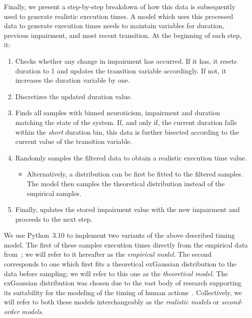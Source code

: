 Finally, we present a step-by-step breakdown of how this data is subsequently used to generate realistic execution times.
A model which uses this processed data to generate execution times needs to maintain variables for duration, previous impairment, and most recent transition.
At the beginning of each step, it:
\begin{enumerate}
    \item Checks whether any change in impairment has occurred.
          If it has, it resets duration to \num{1} and updates the transition variable accordingly.
          If not, it increases the duration variable by one.
    \item Discretizes the updated duration value.
    \item Finds all samples with binned neuroticism, impairment and duration matching the state of the system.
    If, and only if, the current duration falls within the \emph{short} duration bin, this data is further bisected according to the current value of the transition variable.
    \item Randomly samples the filtered data to obtain a realistic execution time value.
          \begin{itemize}
              \item Alternatively, a distribution can be first be fitted to the filtered samples.
                    The model then samples the theoretical distribution instead of the empirical samples.
          \end{itemize}
    \item Finally, updates the stored impairment value with the new impairment and proceeds to the next step.
\end{enumerate}

We use Python~\num{3.10} to implement two variants of the above described timing model.
The first of these samples execution times directly from the empirical data from~\cite{olguinmunoz:impact2021}; we will refer to it hereafter as the \emph{empirical model}.
The second corresponds to one which first fits a theoretical \gls{exGaussian} distribution to the data before sampling; we will refer to this one as the \emph{theoretical model}.
The \gls{exGaussian} distribution was chosen due to the vast body of research supporting its suitability for the modeling of the timing of human actions~\cite{Rohrer1994analysis,Palmer2011shapes,Marmolejo2022generalised}.
Collectively, we will refer to both these models interchangeably as the \emph{realistic models} or \emph{second-order models}.

